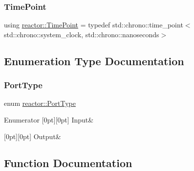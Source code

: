 \subsubsection{\texorpdfstring{Time\+Point}{TimePoint}}
{\footnotesize\ttfamily using \hyperlink{namespacereactor_ad950f8d1a46612500286a4af0f167080}{reactor\+::\+Time\+Point} = typedef std\+::chrono\+::time\+\_\+point$<$std\+::chrono\+::system\+\_\+clock, std\+::chrono\+::nanoseconds$>$}



\subsection{Enumeration Type Documentation}
\mbox{\label{namespacereactor_a08c8e2d85e5bc706b1af8a87e40eec6d}} 
\subsubsection{\texorpdfstring{Port\+Type}{PortType}}
{\footnotesize\ttfamily enum \hyperlink{namespacereactor_a08c8e2d85e5bc706b1af8a87e40eec6d}{reactor\+::\+Port\+Type}\hspace{0.3cm}{\ttfamily [strong]}}

\begin{DoxyEnumFields}{Enumerator}
[0pt][0pt]{}\mbox{\label{namespacereactor_a08c8e2d85e5bc706b1af8a87e40eec6da324118a6721dd6b8a9b9f4e327df2bf5}} 
Input&\\
\hline

[0pt][0pt]{}\mbox{\label{namespacereactor_a08c8e2d85e5bc706b1af8a87e40eec6da29c2c02a361c9d7028472e5d92cd4a54}} 
Output&\\
\hline

\end{DoxyEnumFields}


\subsection{Function Documentation}
\mbox{\label{namespacereactor_a3acae8d24d419d39f72ca08bccf13c94}} 
